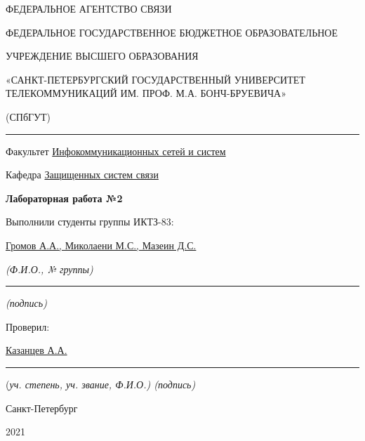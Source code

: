 \documentclass[a4paper,14pt]{extarticle}
\begin{document}
    \begin{center}
        \thispagestyle{empty}
        \begin{singlespace}
        ФЕДЕРАЛЬНОЕ АГЕНТСТВО СВЯЗИ

        ФЕДЕРАЛЬНОЕ ГОСУДАРСТВЕННОЕ БЮДЖЕТНОЕ ОБРАЗОВАТЕЛЬНОЕ

        УЧРЕЖДЕНИЕ ВЫСШЕГО ОБРАЗОВАНИЯ

        «САНКТ-ПЕТЕРБУРГСКИЙ ГОСУДАРСТВЕННЫЙ УНИВЕРСИТЕТ ТЕЛЕКОММУНИКАЦИЙ ИМ. ПРОФ. М.А. БОНЧ-БРУЕВИЧА»

        (СПбГУТ)
        \end{singlespace}
        \vspace{-1ex}
        \rule{\textwidth}{0.4pt}
        \vspace{-5ex}

        Факультет \underline{Инфокоммуникационных сетей и систем}

        Кафедра \underline{Защищенных систем связи}
        \vspace{10ex}

        \textbf{Лабораторная работа №2}\\
        


    \end{center}
    \vspace{4ex}
    \begin{flushright}
    \parbox{10 cm}{
    \begin{flushleft}
        Выполнили студенты группы ИКТЗ-83:

        \underline{Громов А.А., Миколаени М.С., Мазеин Д.С.} \hfill 

        \footnotesize \textit{ (Ф.И.О., № группы)} \hfill \rule[-0.85ex]{0.1\textwidth}{0.6pt}
        
        \hfill \textit{(подпись)} \normalsize

        Проверил:

        \underline{Казанцев А.А.} \hfill \rule[-0.85ex]{0.1\textwidth}{0.6pt}

        (\footnotesize \textit{уч. степень, уч. звание, Ф.И.О.) \hfill (подпись)} \normalsize

    \end{flushleft}
    }
    \end{flushright}
    \begin{center}
        \vfill
        Санкт-Петербург

        2021

    \end{center}
    \newpage
\end{document}
